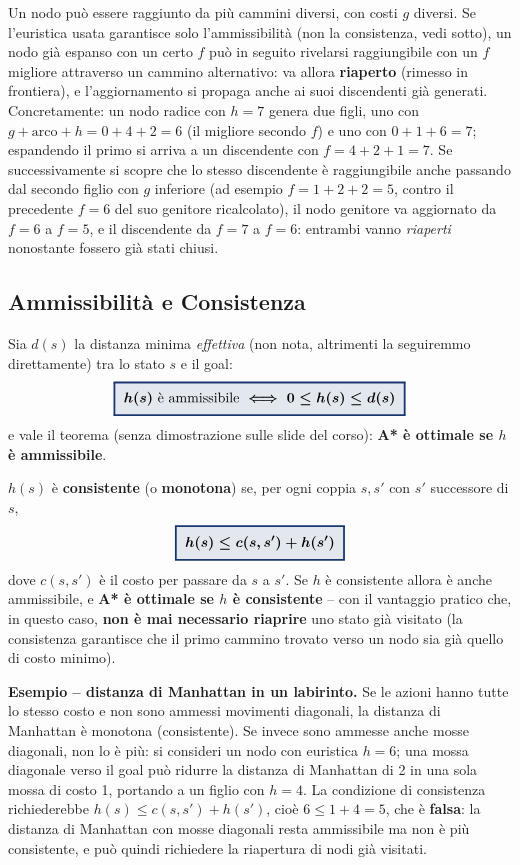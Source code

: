 \documentclass[a4paper,11pt]{article}
\newcommand{\keyeq}[1]{{\setlength{\fboxsep}{6pt}\setlength{\fboxrule}{1.3pt}\fcolorbox{iablue}{iablue!12}{\boldmath$\displaystyle #1$}}}
\begin{document}
Un nodo può essere raggiunto da più cammini diversi, con costi $g$ diversi. Se l'euristica usata garantisce solo l'ammissibilità (non la consistenza, vedi sotto), un nodo già espanso con un certo $f$ può in seguito rivelarsi raggiungibile con un $f$ migliore attraverso un cammino alternativo: va allora \textbf{riaperto} (rimesso in frontiera), e l'aggiornamento si propaga anche ai suoi discendenti già generati. Concretamente: un nodo radice con $h=7$ genera due figli, uno con $g{+}\text{arco}{+}h=0{+}4{+}2=6$ (il migliore secondo $f$) e uno con $0{+}1{+}6=7$; espandendo il primo si arriva a un discendente con $f=4{+}2{+}1=7$. Se successivamente si scopre che lo stesso discendente è raggiungibile anche passando dal secondo figlio con $g$ inferiore (ad esempio $f=1{+}2{+}2=5$, contro il precedente $f=6$ del suo genitore ricalcolato), il nodo genitore va aggiornato da $f=6$ a $f=5$, e il discendente da $f=7$ a $f=6$: entrambi vanno \emph{riaperti} nonostante fossero già stati chiusi.

\subsection{Ammissibilità e Consistenza}

Sia $d(s)$ la distanza minima \emph{effettiva} (non nota, altrimenti la seguiremmo direttamente) tra lo stato $s$ e il goal:
\[
\keyeq{h(s) \text{ è ammissibile} \iff 0\leq h(s)\leq d(s)}
\]
e vale il teorema (senza dimostrazione sulle slide del corso): \textbf{A* è ottimale se $h$ è ammissibile}.

$h(s)$ è \textbf{consistente} (o \textbf{monotona}) se, per ogni coppia $s,s'$ con $s'$ successore di $s$,
\[
\keyeq{h(s) \leq c(s,s') + h(s')}
\]
dove $c(s,s')$ è il costo per passare da $s$ a $s'$. Se $h$ è consistente allora è anche ammissibile, e \textbf{A* è ottimale se $h$ è consistente} -- con il vantaggio pratico che, in questo caso, \textbf{non è mai necessario riaprire} uno stato già visitato (la consistenza garantisce che il primo cammino trovato verso un nodo sia già quello di costo minimo).

\textbf{Esempio -- distanza di Manhattan in un labirinto.} Se le azioni hanno tutte lo stesso costo e non sono ammessi movimenti diagonali, la distanza di Manhattan è monotona (consistente). Se invece sono ammesse anche mosse diagonali, non lo è più: si consideri un nodo con euristica $h=6$; una mossa diagonale verso il goal può ridurre la distanza di Manhattan di 2 in una sola mossa di costo 1, portando a un figlio con $h=4$. La condizione di consistenza richiederebbe $h(s)\leq c(s,s')+h(s')$, cioè $6\leq 1+4=5$, che è \textbf{falsa}: la distanza di Manhattan con mosse diagonali resta ammissibile ma non è più consistente, e può quindi richiedere la riapertura di nodi già visitati.
\end{document}
